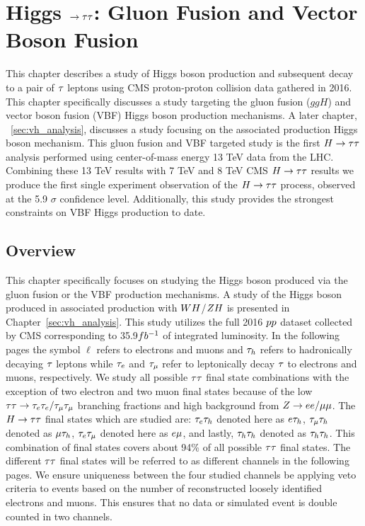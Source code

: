 \chapter{Higgs $\to \tau\tau$: Gluon Fusion and Vector Boson Fusion}
\label{sec:htt_analysis}

This chapter describes a study of Higgs boson production and subsequent
decay to a pair of $\tau$ leptons using CMS proton-proton collision data gathered in 2016. 
This chapter specifically discusses a study targeting the gluon fusion ($ggH$) and
vector boson fusion (VBF) Higgs boson production mechanisms. A later chapter, ~\ref{sec:vh_analysis},
discusses a study focusing on the associated production Higgs boson mechanism.
This gluon fusion and VBF targeted study is the first
$H\to\tau\tau$ analysis performed using center-of-mass energy 13 TeV data from the LHC. Combining
these 13 TeV results with 7 TeV and 8 TeV CMS $H\to\tau\tau$ results we produce
the first single experiment observation of the $H\to\tau\tau$ process, observed at the 5.9 $\sigma$
confidence level. Additionally, this study provides the strongest constraints on VBF Higgs 
production to date.



\section{Overview}

This chapter specifically focuses on studying the Higgs boson produced via the gluon fusion
or the VBF production mechanisms. A study of the Higgs boson produced in associated production with
$WH$/$ZH$ is presented in Chapter~\ref{sec:vh_analysis}. This study utilizes the
full 2016 $pp$ dataset collected by CMS corresponding to 35.9$fb^{-1}$ of integrated luminosity.
In the following pages the symbol $\ell$ refers to electrons and muons and $\tau_{h}$ refers to hadronically
decaying $\tau$ leptons while $\tau_{e}$ and $\tau_{\mu}$ refer to leptonically decay $\tau$ to electrons
and muons, respectively. We study all possible $\tau\tau$ final state combinations with the
exception of two electron and two muon final states because of the low 
$\tau\tau \to \tau_{e}\tau_{e}/\tau_{\mu}\tau_{\mu}$
branching fractions and high background from $Z \to ee/\mu\mu$. The $H\to\tau\tau$ final states which are
studied are: $\tau_{e}\tau_{h}$ denoted here as $e\tau_{h}$, $\tau_{\mu}\tau_{h}$ denoted as $\mu\tau_{h}$,
$\tau_{e}\tau_{\mu}$ denoted here as $e\mu$, and lastly, $\tau_{h}\tau_{h}$ denoted as $\tau_{h}\tau_{h}$.
This combination of final states covers about 94\% of all possible $\tau\tau$ final states.
The different $\tau\tau$ final states will be referred to as different channels in the following pages.
We ensure uniqueness between the four studied channels be applying veto criteria to events based
on the number of reconstructed loosely identified electrons and muons. This ensures that 
no data or simulated event is double counted in two channels.

